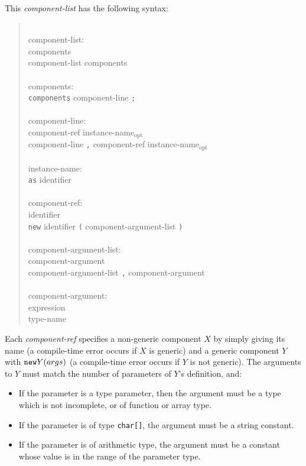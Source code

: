 \documentclass[11pt,letterpaper]{article}
\newcommand{\kw}[1]{{\tt #1}}
\newcommand{\code}[1]{{\tt #1}}
\newcommand{\opt}{$_{\mbox{opt}}$\xspace}
\newcommand{\grammarshift}{\vspace*{-.7cm}}
\newcommand{\grammarindent}{\hspace*{2cm}\= \\ \kill}
\begin{document}
This \emph{component-list} has the following syntax:
\begin{quote} \grammarshift \em \begin{tabbing}
\grammarindent
component-list:\\
\>	components\\
\>	component-list components\\
\\
components:\\
\>	\kw{components} component-line \kw{;}\\
\\
component-line:\\
\>	component-ref instance-name\opt\\
\>	component-line \kw{,} component-ref instance-name\opt\\
\\
instance-name:\\
\>	\kw{as} identifier\\
\\
component-ref:\\
\>	identifier\\
\>	\kw{new} identifier \kw{(} component-argument-list \kw{)}\\
\\
component-argument-list:\\
\>	component-argument\\
\>	component-argument-list \kw{,} component-argument\\
\\
component-argument:\\
\>	expression\\
\>	type-name
\end{tabbing} \end{quote}
Each \emph{component-ref} specifies a non-generic component $X$ by simply
giving its name (a compile-time error occurs if $X$ is generic) and
a generic component $Y$ with $\kw{new} Y(args)$ (a compile-time error occurs
if $Y$ is not generic). The arguments to $Y$ must match the number of
parameters of $Y$'s definition, and:
\begin{itemize}
\item If the parameter is a type parameter, then the argument must be
a type which is not incomplete, or of function or array type.
\item If the parameter is of type \code{char[]}, the argument must be
a string constant.
\item If the parameter is of arithmetic type, the argument must be a 
constant whose value is in the range of the parameter type.
\end{itemize}
\end{document}
